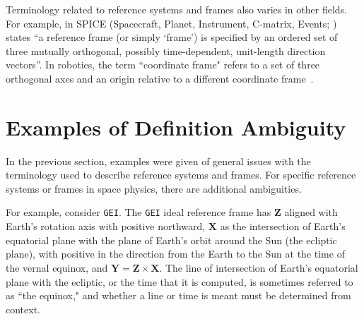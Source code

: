 \documentclass[draft]{agujournal2019}
\begin{document}

Terminology related to reference systems and frames also varies in other fields. For example, in SPICE (Spacecraft, Planet, Instrument, C-matrix, Events; ) states ``a reference frame (or simply `frame') is specified by an ordered set of three mutually orthogonal, possibly time-dependent, unit-length direction vectors''. In robotics, the term ``coordinate frame" refers to a set of three orthogonal axes and an origin relative to a different coordinate frame~\cite{Murray2017}. 

\section{Examples of Definition Ambiguity}
\label{sect:definitions}

In the previous section, examples were given of general issues with the terminology used to describe reference systems and frames. For specific reference systems or frames in space physics, there are additional ambiguities.

For example, consider \texttt{GEI}. The \texttt{GEI} ideal reference frame has $\mathbf{Z}$ aligned with Earth's rotation axis with positive northward, $\mathbf{X}$ as the intersection of Earth's equatorial plane with the plane of Earth's orbit around the Sun (the ecliptic plane), with positive in the direction from the Earth to the Sun at the time of the vernal equinox, and $\mathbf{Y}=\mathbf{Z}\times\mathbf{X}$. The line of intersection of Earth's equatorial plane with the ecliptic, or the time that it is computed, is sometimes referred to as ``the equinox," and whether a line or time is meant must be determined from context.
\end{document}
